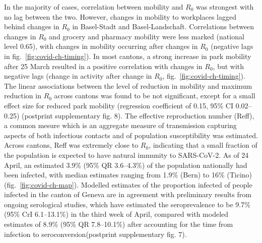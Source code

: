In the majority of cases, correlation between mobility and $R_0$ was strongest with no lag between the two. However, changes in mobility to workplaces lagged behind changes in $R_0$ in Basel-Stadt and Basel-Landschaft. Correlations between changes in $R_0$ and grocery and pharmacy mobility were less marked (national level 0.65), with changes in mobility occurring after changes in $R_0$ (negative lags in fig.~\ref{fig:covid-ch-timing}). In most cantons, a strong increase in park mobility after 25 March resulted in a positive correlation with changes in $R_0$, but with negative lags (change in activity after change in $R_0$, fig.~\ref{fig:covid-ch-timing}). 
The linear associations between the level of reduction in mobility and maximum reduction in $R_0$ across cantons was found to be not significant, except for a small effect size for reduced park mobility (regression coefficient of 0.15, 95\% CI 0.02–0.25) (postprint supplementary fig. 8). 
The effective reproduction number (Reff), a common mesure which is an aggregate measure of transmission capturing aspects of both infectious contacts and of population susceptibility was estimated. Across cantons, Reff was extremely close to $R_0$, indicating that a small fraction of the population is expected to have natural immunity to SARS-CoV-2. 
As of 24 April, an estimated 3.9\% (95\% QR 3.6–4.3\%) of the population nationally had been infected, with median estimates ranging from 1.9\% (Bern) to 16\% (Ticino) (fig.~\ref{fig:covid-ch-map}). 
Modelled estimates of the proportion infected of people infected in the canton of Geneva are in agreement with preliminary results from ongoing serological studies, which have estimated the seroprevalence to be 9.7\% (95\% CrI 6.1–13.1\%) in the third week of April\cite[3\baselineskip]{Stringhini:RepeatedSeroprevalenceAntiSARSCoV2:2020}, compared with modeled estimates of 8.9\% (95\% QR 7.8–10.1\%) after accounting for the time from infection to seroconversion\cite{Wolfel:VirologicalAssessmentHospitalized:2020}(postprint supplementary fig. 7).


